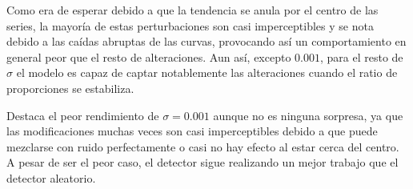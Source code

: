 Como era de esperar debido a que la tendencia se anula por el centro de las series, la mayoría de estas perturbaciones son casi imperceptibles y se nota debido a las caídas abruptas de las curvas, provocando así un comportamiento en general peor que el resto de alteraciones. Aun así, excepto $0.001$, para el resto de $\sigma$ el modelo es capaz de captar notablemente las alteraciones cuando el ratio de proporciones se estabiliza.

Destaca el peor rendimiento de $\sigma = 0.001$ aunque no es ninguna sorpresa, ya que las modificaciones muchas veces son casi imperceptibles debido a que puede mezclarse con ruido perfectamente o casi no hay efecto al estar cerca del centro. A pesar de ser el peor caso, el detector sigue realizando un mejor trabajo que el detector aleatorio.

\endinput

